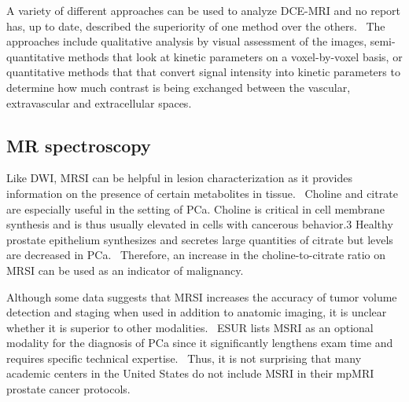 A variety of different approaches can be used to analyze DCE-MRI and no report
has, up to date, described the superiority of one method over the others.~\cite{Gupta2013} The
approaches include qualitative analysis by visual assessment of the images,
semi-quantitative methods that look at kinetic parameters on a voxel-by-voxel
basis, or quantitative methods that that convert signal intensity into kinetic
parameters to determine how much contrast is being exchanged between the
vascular, extravascular and extracellular spaces.~\cite{Gupta2013}
	
\subsection{MR spectroscopy}
Like DWI, MRSI can be helpful in lesion characterization as it provides
information on the presence of certain metabolites in
tissue.~\cite{Barentsz2012} Choline and citrate are especially useful in the
setting of PCa. Choline is critical in cell membrane synthesis and is thus
usually elevated in cells with cancerous behavior.3 Healthy prostate epithelium
synthesizes and secretes large quantities of citrate but levels are decreased
in PCa.~\cite{Costello1999,Kurhanewicz2002} Therefore, an increase in the
choline-to-citrate ratio on MRSI can be used as an indicator of
malignancy.~\cite{Bonekamp2011}

Although some data suggests that MRSI increases the accuracy of tumor volume
detection and staging when used in addition to anatomic imaging, it is unclear
whether it is superior to other modalities.~\cite{Bonekamp2011} ESUR lists MSRI
as an optional modality for the diagnosis of PCa since it significantly
lengthens exam time and requires specific technical
expertise.~\cite{Barentsz2012} Thus, it is not surprising that many academic
centers in the United States do not include MSRI in their mpMRI prostate cancer
protocols.~\cite{Gupta2013}
